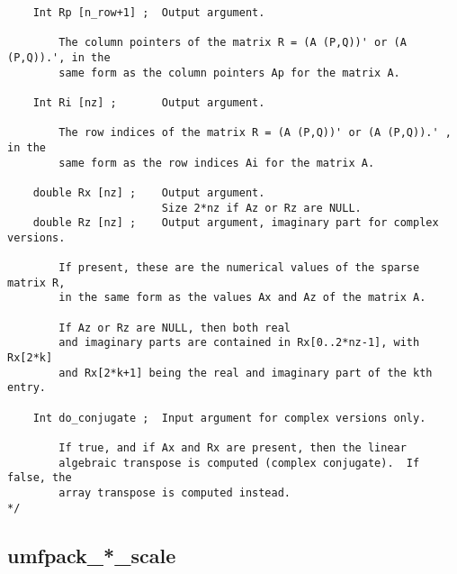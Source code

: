 \documentclass[11pt]{article}
\begin{document}
{\begin{verbatim}
    Int Rp [n_row+1] ;  Output argument.

        The column pointers of the matrix R = (A (P,Q))' or (A (P,Q)).', in the
        same form as the column pointers Ap for the matrix A.

    Int Ri [nz] ;       Output argument.

        The row indices of the matrix R = (A (P,Q))' or (A (P,Q)).' , in the
        same form as the row indices Ai for the matrix A.

    double Rx [nz] ;    Output argument.
                        Size 2*nz if Az or Rz are NULL.
    double Rz [nz] ;    Output argument, imaginary part for complex versions.

        If present, these are the numerical values of the sparse matrix R,
        in the same form as the values Ax and Az of the matrix A.

        If Az or Rz are NULL, then both real
        and imaginary parts are contained in Rx[0..2*nz-1], with Rx[2*k]
        and Rx[2*k+1] being the real and imaginary part of the kth entry.

    Int do_conjugate ;  Input argument for complex versions only.

        If true, and if Ax and Rx are present, then the linear
        algebraic transpose is computed (complex conjugate).  If false, the
        array transpose is computed instead.
*/
\end{verbatim}
}

\newpage
\subsection{umfpack\_*\_scale}
\end{document}
